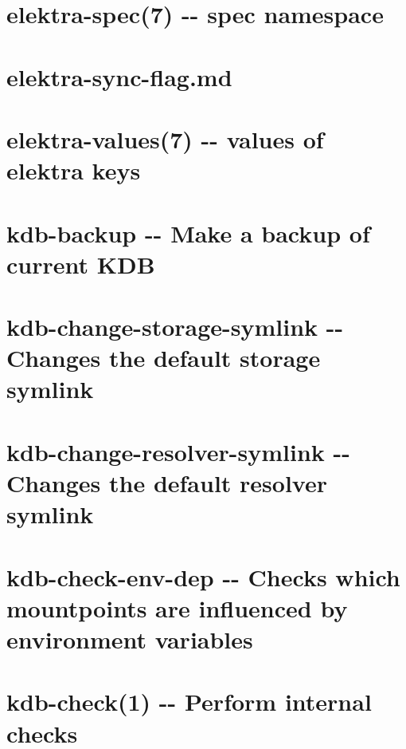 \documentclass[twoside]{book}
\newcommand{\+}{\discretionary{\mbox{\scriptsize$\hookleftarrow$}}{}{}}
\begin{document}
\chapter{elektra-\/spec(7) -\/-\/ spec namespace}
\label{md_doc_help_elektra-spec}

\chapter{elektra-\/sync-\/flag.md}
\label{doc_help_elektra-sync-flag_md}

\chapter{elektra-\/values(7) -\/-\/ values of elektra keys}
\label{md_doc_help_elektra-values}

\chapter{kdb-\/backup -\/-\/ Make a backup of current K\+DB}
\label{md_doc_help_kdb-backup}

\chapter{kdb-\/change-\/storage-\/symlink -\/-\/ Changes the default storage symlink}
\label{md_doc_help_kdb-change-resolver-symlink}

\chapter{kdb-\/change-\/resolver-\/symlink -\/-\/ Changes the default resolver symlink}
\label{md_doc_help_kdb-change-storage-symlink}

\chapter{kdb-\/check-\/env-\/dep -\/-\/ Checks which mountpoints are influenced by environment variables}
\label{md_doc_help_kdb-check-env-dep}

\chapter{kdb-\/check(1) -\/-\/ Perform internal checks}
\label{md_doc_help_kdb-check}

\end{document}
